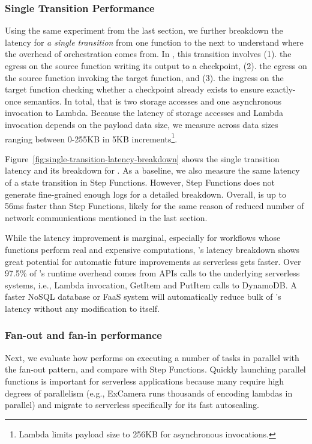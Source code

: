 \subsubsection{Single Transition Performance}

Using the same experiment from the last section, we further breakdown the
latency for \emph{a single transition} from one function to the next to
understand where the overhead of orchestration comes from. In \name{}, this
transition involves (1). the egress on the source function writing its output
to a checkpoint, (2). the egress on the source function invoking the target
function, and (3). the ingress on the target function checking whether a
checkpoint already exists to ensure exactly-once semantics. In total, that is
two storage accesses and one asynchronous invocation to Lambda. Because the
latency of storage accesses and Lambda invocation depends on the payload data
size, we measure across data sizes ranging between 0-255KB in 5KB
increments\footnote{Lambda limits payload size to 256KB for asynchronous
invocations.}.

Figure~\ref{fig:single-transition-latency-breakdown} shows the single transition
latency and its breakdown for \name{}. As a baseline, we also measure the same
latency of a state transition in Step Functions. However, Step Functions does
not generate fine-grained enough logs for a detailed breakdown. Overall,
\name{} is up to 56ms faster than Step Functions, likely for the same reason
of reduced number of network communications mentioned in the last section.

While the latency improvement is marginal, especially for workflows whose
functions perform real and expensive computations, \name{}'s latency breakdown
shows great potential for automatic future improvements as serverless gets
faster. Over 97.5\% of \name{}'s runtime overhead comes from APIs calls to the
underlying serverless systems, i.e., Lambda invocation, GetItem and PutItem
calls to DynamoDB. A faster NoSQL database or FaaS system will automatically
reduce bulk of \name{}'s latency without any modification to \name{} itself.


\subsubsection{Fan-out and fan-in performance}\label{sec:eval:fan-out}

Next, we evaluate how \name{} performs on executing a number of tasks in
parallel with the fan-out pattern, and compare with Step Functions. Quickly
launching parallel functions is important for serverless applications because
many require high degrees of parallelism (e.g., ExCamera runs thousands of
encoding lambdas in parallel) and migrate to serverless specifically for its
fast autoscaling.

